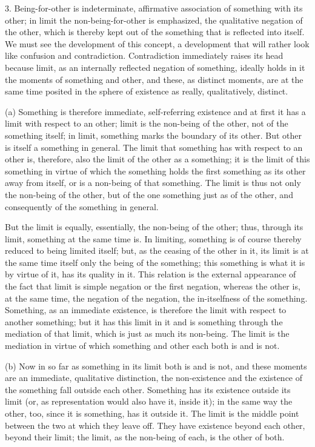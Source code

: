3. Being-for-other is indeterminate, affirmative
association of something with its other;
in limit the non-being-for-other is emphasized,
the qualitative negation of the other,
which is thereby kept out of the something
that is reflected into itself.
We must see the development of this concept,
a development that will rather look like
confusion and contradiction.
Contradiction immediately raises its head
because limit, as an internally reflected negation of something,
ideally holds in it the moments of something and other,
and these, as distinct moments, are at the same time
posited in the sphere of existence
as really, qualitatively, distinct.

(a) Something is therefore immediate, self-referring existence
and at first it has a limit with respect to an other;
limit is the non-being of the other,
not of the something itself;
in limit, something marks the boundary of its other.
But other is itself a something in general.
The limit that something has with respect to
an other is, therefore, also the limit of
the other as a something;
it is the limit of this something in virtue of which
the something holds the first something
as its other away from itself,
or is a non-being of that something.
The limit is thus not only the non-being of the other,
but of the one something just as of the other,
and consequently of the something in general.

But the limit is equally, essentially,
the non-being of the other;
thus, through its limit,
something at the same time is.
In limiting, something is of course thereby
reduced to being limited itself;
but, as the ceasing of the other in it,
its limit is at the same time itself
only the being of the something;
this something is what it is by virtue of it,
has its quality in it.
This relation is the external appearance of the fact
that limit is simple negation or the first negation,
whereas the other is, at the same time,
the negation of the negation,
the in-itselfness of the something.
Something, as an immediate existence,
is therefore the limit with respect
to another something;
but it has this limit in it
and is something through the mediation of that limit,
which is just as much its non-being.
The limit is the mediation in virtue of
which something and other each both is and is not.

(b) Now in so far as something in its limit
both is and is not,
and these moments are an immediate, qualitative distinction,
the non-existence and the existence of the something
fall outside each other.
Something has its existence outside its limit
(or, as representation would also have it, inside it);
in the same way the other, too,
since it is something, has it outside it.
The limit is the middle point between the two
at which they leave off.
They have existence beyond each other,
beyond their limit;
the limit, as the non-being of each,
is the other of both.

